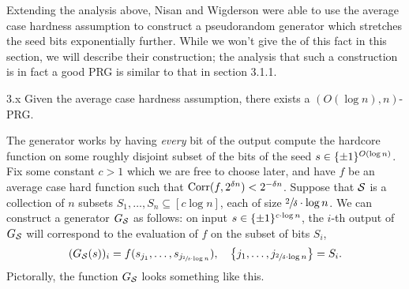 \documentclass[11pt]{article}
\begin{document}
Extending the analysis above, Nisan and Wigderson were able to use the average case hardness assumption to construct a pseudorandom generator which stretches the seed bits exponentially further. While we won't give the of this fact in this section, we will describe their construction; the analysis that such a construction is in fact a good PRG is similar to that in section 3.1.1.
\begin{theorem}{3.x}
    Given the average case hardness assumption, there exists a $(O(\log n), n)$-PRG.
\end{theorem}
\noindent
The generator works by having \emph{every} bit of the output compute the hardcore function on some roughly disjoint subset of the bits of the seed $s \in \{\pm 1\}^{O(\log n)}$. Fix some constant $c > 1$ which we are free to choose later, and have $f$ be an average case hard function such that $\mathrm{Corr}(f, 2^{\delta n}) < 2^{-\delta n}$. Suppose that $\mathcal{S}$ is a collection of $n$ subsets $S_1, \ldots, S_n \subseteq [c \log n]$, each of size $\sfrac{2}{\delta} \cdot \log n$. We can construct a generator $G_{\mathcal{S}}$ as follows: on input $s \in \{\pm 1\}^{c \cdot \log n}$, the $i$-th output of $G_{\mathcal{S}}$ will correspond to the evaluation of $f$ on the subset of bits $S_i$,
\begin{equation*}
    (G_{\mathcal{S}}(s))_{i} = f(s_{j_1}, \ldots, s_{j_{\sfrac{2}{\delta} \cdot \log n}}), \quad \left\{j_1, \ldots, j_{\sfrac{2}{\delta} \cdot \log n}\right\} = S_i.
\end{equation*}
Pictorally, the function $G_{\mathcal{S}}$ looks something like this.
\end{document}
